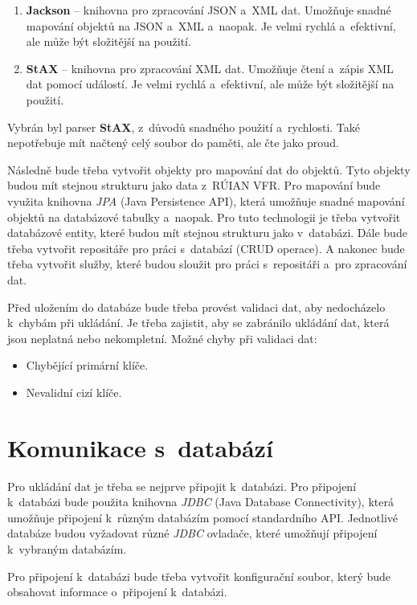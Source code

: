 \begin{enumerate}
    \item \textbf{Jackson} -- knihovna pro zpracování JSON a~XML dat. Umožňuje snadné mapování 
    objektů na JSON a~XML a~naopak. Je velmi rychlá a~efektivní, ale může být složitější na použití.
    \item \textbf{StAX} -- knihovna pro zpracování XML dat. Umožňuje 
    čtení a~zápis XML dat pomocí událostí. Je velmi rychlá a~efektivní, ale může být 
    složitější na použití.
\end{enumerate}

Vybrán byl parser \textbf{StAX}, z~důvodů snadného použití a~rychlosti.
Také nepotřebuje mít načtený celý soubor do paměti, ale čte jako proud.

Následně bude třeba vytvořit objekty pro mapování dat do objektů.
Tyto objekty budou mít stejnou strukturu jako data z~RÚIAN VFR.
Pro mapování bude využita knihovna \textit{JPA} (Java Persistence API), která umožňuje snadné 
mapování objektů na databázové tabulky a~naopak.
Pro tuto technologii je třeba vytvořit databázové entity, které budou mít stejnou strukturu jako
v~databázi. Dále bude třeba vytvořit repositáře pro práci s~databází (CRUD operace).
A nakonec bude třeba vytvořit služby, které budou sloužit pro práci s~repositáři a~pro zpracování dat.

Před uložením do databáze bude třeba provést validaci dat, aby nedocházelo k~chybám při
ukládání. Je třeba zajistit, aby se zabránilo ukládání dat, která jsou neplatná nebo nekompletní.
Možné chyby při validaci dat:
\begin{itemize}
    \item Chybějící primární klíče.
    \item Nevalidní cizí klíče.
\end{itemize}

\section{Komunikace s~databází}
\label{sec:komunikaceDB}
Pro ukládání dat je třeba se nejprve připojit k~databázi.
Pro připojení k~databázi bude použita knihovna \textit{JDBC} (Java Database Connectivity), která
umožňuje připojení k~různým databázím pomocí standardního API.
Jednotlivé databáze budou vyžadovat různé \textit{JDBC} ovladače, které umožňují připojení k~vybraným databázím.

Pro připojení k~databázi bude třeba vytvořit konfigurační soubor, který bude obsahovat
informace o~připojení k~databázi.

